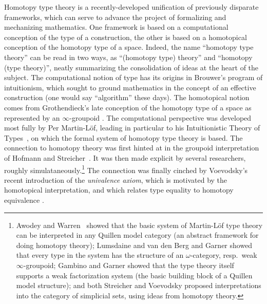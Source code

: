 \documentclass[11pt]{article}
\theoremstyle{remark}
\theoremstyle{definition}
\begin{document}
Homotopy type theory is a recently-developed unification of previously disparate frameworks, which can serve to advance the project of formalizing and mechanizing mathematics.  One framework is based on a computational conception of the type of a construction, the other is based on a homotopical conception of the homotopy type of a space.  Indeed, the name ``homotopy type theory'' can be read in two ways, as
``(homotopy type) theory'' and ``homotopy (type theory)'', neatly summarizing the consolidation of ideas at the heart of
the subject.  The computational notion of type has its origins in Brouwer's program of intuitionism, which sought to
ground mathematics in the concept of an effective construction (one would say ``algorithm'' these days).  The
homotopical notion comes from Grothendieck's late conception of the homotopy type of a space as represented by an $\infty$-groupoid \cite{GrothPS}.  The computational perspective was developed most fully by Per Martin-L\"{o}f, leading in
particular to his Intuitionistic Theory of Types~\cite{mltt}, on which the formal system of homotopy type theory is
based.  The connection to homotopy theory was first hinted at in the groupoid interpretation of Hofmann and
Streicher~\cite{HS,HofmannM:gromtt}.  It was then made explicit by several researchers, roughly simulataneously.\footnote{%
Awodey and Warren~\cite{AW} showed that the basic system of Martin-L\"{o}f type theory can be interpreted in any Quillen model category (an abstract framework for doing homotopy theory); Lumsdaine \cite{L} and van den Berg and Garner \cite{vandenBergB:typwg} showed that every type in the system has the structure of an $\omega$-category, resp.\ weak $\infty$-groupoid; Gambino and Garner \cite{GG} showed that the type theory itself supports a weak factorization system (the basic building block of a Quillen model structure); and both Streicher \cite{StreicherNote} and Voevodsky \cite{VVnote} proposed interpretations into the category of simplicial sets, using ideas from homotopy theory.}
The connection was finally cinched by Voevodsky's recent introduction of the \emph{univalence axiom}, which is motivated by the homotopical interpretation, and which relates type equality to homotopy equivalence \cite{KLV,APW}.

\end{document}

